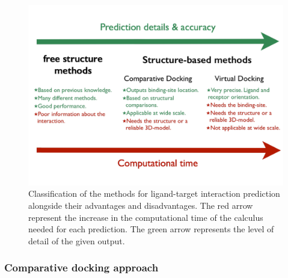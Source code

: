 \documentclass[11pt, b5paper,twoside]{tesi_upf}
\begin{document}
\begin{figure}[htbp]

  \centering
  	\includegraphics[width=\textwidth]{../figures/type_of_methods.pdf} %

	\caption[Type of computational methods for ligand-target interaction prediction]{Classification of the methods for ligand-target interaction prediction alongside their advantages and disadvantages. The red arrow represent the increase in the computational time of the calculus needed for each prediction. The green arrow represents the level of detail of the given output.}
	\label{fig:type_ligandtarget_methods}
\end{figure}
\subsubsection{Comparative docking approach}\label{comparative-docking}
\end{document}
